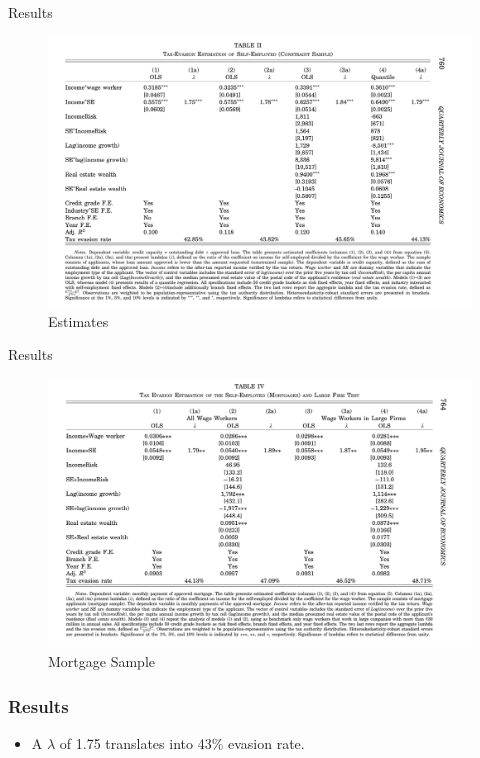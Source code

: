 \documentclass{beamer}
\begin{document}
\begin{frame}{Results}
    \begin{figure}
        \centering
                \caption{Estimates}
\includegraphics[width=\textwidth,height=\textheight,keepaspectratio]{Paper Presentations/T2.png}
    \end{figure}
\end{frame}

\begin{frame}{Results}
    \begin{figure}
        \centering
                \caption{Mortgage Sample}
\includegraphics[width=\textwidth,height=\textheight,keepaspectratio]{Paper Presentations/T4.png}
    \end{figure}
\end{frame}

\begin{frame}
\frametitle{Results}
\begin{itemize}
    \item A $\lambda$ of 1.75 translates into 43\% evasion rate.
\end{itemize}
\end{frame}
\end{document}
